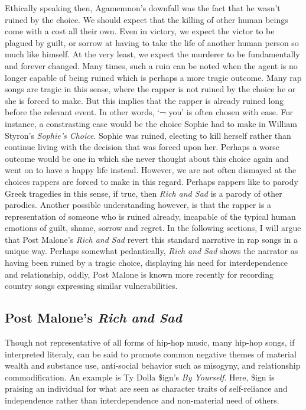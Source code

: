 \documentclass[
  letterpaper,
  DIV=11,
  numbers=noendperiod]{scrartcl}
\theoremstyle{remark}
\begin{document}
Ethically speaking then, Agamemnon's downfall was the fact that he
wasn't ruined by the choice. We should expect that the killing of other
human beings come with a cost all their own. Even in victory, we expect
the victor to be plagued by guilt, or sorrow at having to take the life
of another human person so much like himself. At the very least, we
expect the murderer to be fundamentally and forever changed. Many times,
such a ruin can be noted when the agent is no longer capable of being
ruined which is perhaps a more tragic outcome. Many rap songs are tragic
in this sense, where the rapper is not ruined by the choice he or she is
forced to make. But this implies that the rapper is already ruined long
before the relevant event. In other words, `¬ you' is often chosen with
ease. For instance, a constrasting case would be the choice Sophie had
to make in William Styron's \emph{Sophie's Choice}. Sophie was ruined,
electing to kill herself rather than continue living with the decision
that was forced upon her. Perhaps a worse outcome would be one in which
she never thought about this choice again and went on to have a happy
life instead. However, we are not often dismayed at the choices rappers
are forced to make in this regard. Perhaps rappers like to parody Greek
tragedies in this sense, if true, then \emph{Rich and Sad} is a parody
of other parodies. Another possible understanding however, is that the
rapper is a representation of someone who is ruined already, incapable
of the typical human emotions of guilt, shame, sorrow and regret. In the
following sections, I will argue that Post Malone's \emph{Rich and Sad}
revert this standard narrative in rap songs in a unique way. Perhaps
somewhat pedantically, \emph{Rich and Sad} shows the narrator as having
been ruined by a tragic choice, displaying his need for interdependence
and relationship, oddly, Post Malone is known more recently for
recording country songs expressing similar vulnerabilities.

\subsection{\texorpdfstring{Post Malone's \emph{Rich and
Sad}}{Post Malone's Rich and Sad}}\label{post-malones-rich-and-sad}

Though not representative of all forms of hip-hop music, many hip-hop
songs, if interpreted literaly, can be said to promote common negative
themes of material wealth and substance use, anti-social behavior such
as misogyny, and relationship commodification. An example is Ty Dolla
\$ign's \emph{By Yourself}. Here, \$ign is praising an individual for
what are seen as character traits of self-reliance and independence
rather than interdependence and non-material need of others.
\end{document}
